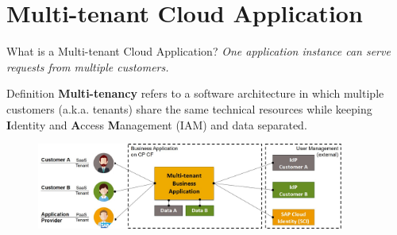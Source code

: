 \part{Multi-tenant Cloud Application}

\begin{frame}{What is a Multi-tenant Cloud Application?}
\textit{One application instance can serve requests from multiple customers.}
\vfill
\begin{block}{Definition}
\textbf{Multi-tenancy} refers to a software architecture in which multiple customers (a.k.a. tenants) share the 
same technical resources while keeping \textbf{I}dentity and \textbf{A}ccess \textbf{M}anagement (IAM) and data separated.
\end{block}
\vfill
\begin{figure}
        \includegraphics[width=0.9\textwidth]{../MultiTenancy/images/MultiTenantApplication_Simple}
\end{figure}
\end{frame}

